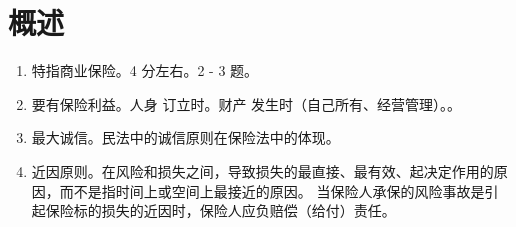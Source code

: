 \section{概述}
\begin{enumerate}
  \item 特指商业保险。4 分左右。2 - 3 题。
  \item 要有保险利益。人身 \yjt 订立时。财产 \yjt 发生时（自己所有、经营管理）。。
  \item 最大诚信。民法中的诚信原则在保险法中的体现。
  \item 近因原则。在风险和损失之间，导致损失的最直接、最有效、起决定作用的原因，而不是指时间上或空间上最接近的原因。
        当保险人承保的风险事故是引起保险标的损失的近因时，保险人应负赔偿（给付）责任。
\end{enumerate}
